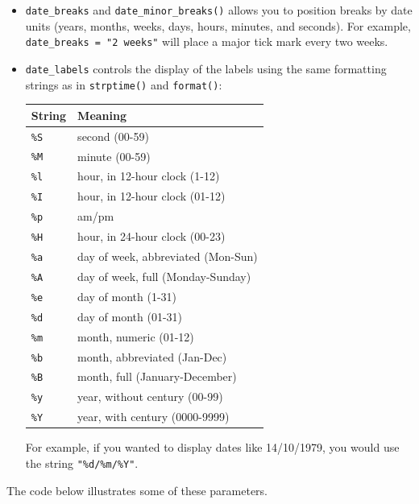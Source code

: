 \begin{itemize}
\item
  \texttt{date\_breaks} and \texttt{date\_minor\_breaks()} allows you to
  position breaks by date units (years, months, weeks, days, hours,
  minutes, and seconds). For example,
  \texttt{date\_breaks\ =\ "2\ weeks"} will place a major tick mark
  every two weeks.
\item
  \texttt{date\_labels} controls the display of the labels using the
  same formatting strings as in \texttt{strptime()} and
  \texttt{format()}:

  \begin{longtable}[c]{@{}ll@{}}
  \toprule
  String & Meaning\tabularnewline
  \midrule
  \endhead
  \texttt{\%S} & second (00-59)\tabularnewline
  \texttt{\%M} & minute (00-59)\tabularnewline
  \texttt{\%l} & hour, in 12-hour clock (1-12)\tabularnewline
  \texttt{\%I} & hour, in 12-hour clock (01-12)\tabularnewline
  \texttt{\%p} & am/pm\tabularnewline
  \texttt{\%H} & hour, in 24-hour clock (00-23)\tabularnewline
  \texttt{\%a} & day of week, abbreviated (Mon-Sun)\tabularnewline
  \texttt{\%A} & day of week, full (Monday-Sunday)\tabularnewline
  \texttt{\%e} & day of month (1-31)\tabularnewline
  \texttt{\%d} & day of month (01-31)\tabularnewline
  \texttt{\%m} & month, numeric (01-12)\tabularnewline
  \texttt{\%b} & month, abbreviated (Jan-Dec)\tabularnewline
  \texttt{\%B} & month, full (January-December)\tabularnewline
  \texttt{\%y} & year, without century (00-99)\tabularnewline
  \texttt{\%Y} & year, with century (0000-9999)\tabularnewline
  \bottomrule
  \end{longtable}

  For example, if you wanted to display dates like 14/10/1979, you would
  use the string \texttt{"\%d/\%m/\%Y"}.
\end{itemize}

The code below illustrates some of these parameters.

\begin{Shaded}
\end{Shaded}

